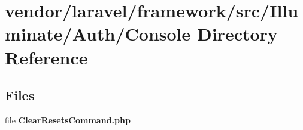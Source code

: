 \section{vendor/laravel/framework/src/\+Illuminate/\+Auth/\+Console Directory Reference}
\label{dir_a067abcc6db40747b3e2310c7ed76faf}
\subsection*{Files}
\begin{DoxyCompactItemize}
\item 
file {\bf Clear\+Resets\+Command.\+php}
\end{DoxyCompactItemize}
